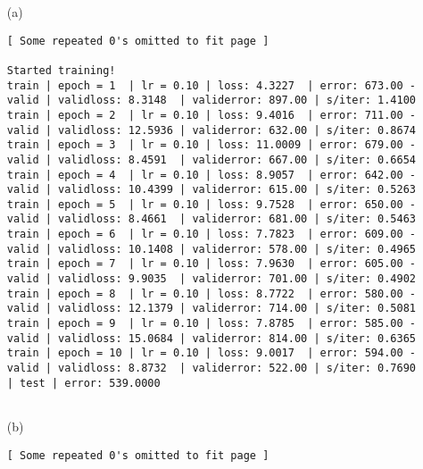 \documentclass{article}
\begin{document}
\begin{itemize}
\begin{landscape}
\begin{itemize}
	\item[(a)]

    \begin{Verbatim}[fontsize=\small]
    [ Some repeated 0's omitted to fit page ]
    
Started training!	
train | epoch = 1  | lr = 0.10 | loss: 4.3227  | error: 673.00 - valid | validloss: 8.3148  | validerror: 897.00 | s/iter: 1.4100	
train | epoch = 2  | lr = 0.10 | loss: 9.4016  | error: 711.00 - valid | validloss: 12.5936 | validerror: 632.00 | s/iter: 0.8674	
train | epoch = 3  | lr = 0.10 | loss: 11.0009 | error: 679.00 - valid | validloss: 8.4591  | validerror: 667.00 | s/iter: 0.6654	
train | epoch = 4  | lr = 0.10 | loss: 8.9057  | error: 642.00 - valid | validloss: 10.4399 | validerror: 615.00 | s/iter: 0.5263	
train | epoch = 5  | lr = 0.10 | loss: 9.7528  | error: 650.00 - valid | validloss: 8.4661  | validerror: 681.00 | s/iter: 0.5463	
train | epoch = 6  | lr = 0.10 | loss: 7.7823  | error: 609.00 - valid | validloss: 10.1408 | validerror: 578.00 | s/iter: 0.4965	
train | epoch = 7  | lr = 0.10 | loss: 7.9630  | error: 605.00 - valid | validloss: 9.9035  | validerror: 701.00 | s/iter: 0.4902	
train | epoch = 8  | lr = 0.10 | loss: 8.7722  | error: 580.00 - valid | validloss: 12.1379 | validerror: 714.00 | s/iter: 0.5081	
train | epoch = 9  | lr = 0.10 | loss: 7.8785  | error: 585.00 - valid | validloss: 15.0684 | validerror: 814.00 | s/iter: 0.6365	
train | epoch = 10 | lr = 0.10 | loss: 9.0017  | error: 594.00 - valid | validloss: 8.8732  | validerror: 522.00 | s/iter: 0.7690	
| test | error: 539.0000   
    
    \end{Verbatim}
	
	\item[(b)]
	
	\begin{Verbatim}[fontsize=\small]
    [ Some repeated 0's omitted to fit page ]
	

\end{Verbatim}
\end{itemize}
\end{landscape}
\end{itemize}
\end{document}

